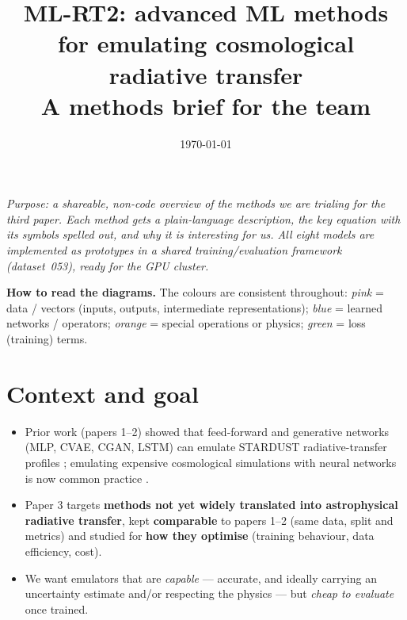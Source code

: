 \documentclass[11pt]{article}
\title{ML-RT2: advanced ML methods for emulating cosmological radiative transfer\\[4pt]
\large A methods brief for the team}
\author{}
\date{\today}
\begin{document}
\maketitle

\noindent\emph{Purpose: a shareable, non-code overview of the methods we are trialing for the
third paper. Each method gets a plain-language description, the key equation with its symbols
spelled out, and why it is interesting for us. All eight models are implemented as prototypes in a
shared training/evaluation framework (dataset~053), ready for the GPU cluster.}

\medskip
\noindent\textbf{How to read the diagrams.} The colours are consistent throughout:
\emph{pink} = data / vectors (inputs, outputs, intermediate representations);
\emph{blue} = learned networks / operators;
\emph{orange} = special operations or physics;
\emph{green} = loss (training) terms.

\section{Context and goal}
\begin{itemize}
  \item Prior work (papers 1--2) showed that feed-forward and generative networks (MLP, CVAE, CGAN,
        LSTM) can emulate STARDUST radiative-transfer profiles \citep{Krause2018}; emulating
        expensive cosmological simulations with neural networks is now common practice
        \citep{Kern2017}.
  \item Paper 3 targets \textbf{methods not yet widely translated into astrophysical radiative
        transfer}, kept \textbf{comparable} to papers 1--2 (same data, split and metrics) and studied
        for \textbf{how they optimise} (training behaviour, data efficiency, cost).
  \item We want emulators that are \emph{capable} --- accurate, and ideally carrying an uncertainty
        estimate and/or respecting the physics --- but \emph{cheap to evaluate} once trained.
\end{itemize}
\end{document}
